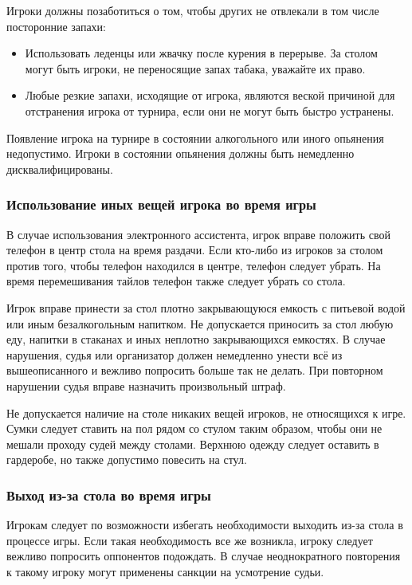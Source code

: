Игроки должны позаботиться о том, чтобы других не отвлекали в том числе посторонние запахи:
\begin{itemize}
	\item Использовать леденцы или жвачку после курения в перерыве. За столом могут быть игроки, не переносящие запах табака, уважайте их право.
	\item Любые резкие запахи, исходящие от игрока, являются веской причиной для отстранения игрока от турнира, если они не могут быть быстро устранены.
\end{itemize}

Появление игрока на турнире в состоянии алкогольного или иного опьянения недопустимо. Игроки в состоянии опьянения должны быть немедленно дисквалифицированы.

\subsubsection{Использование иных вещей игрока во время игры}
В случае использования электронного ассистента, игрок вправе положить свой телефон в центр стола на время раздачи. Если кто-либо из игроков за столом против того, чтобы телефон находился в центре, телефон следует убрать. На время перемешивания тайлов телефон также следует убрать со стола.

Игрок вправе принести за стол плотно закрывающуюся емкость с питьевой водой или иным безалкогольным напитком. Не допускается приносить за стол любую еду, напитки в стаканах и иных неплотно закрывающихся емкостях. В случае нарушения, судья или организатор должен немедленно унести всё из вышеописанного и вежливо попросить больше так не делать. При повторном нарушении судья вправе назначить произвольный штраф.

Не допускается наличие на столе никаких вещей игроков, не относящихся к игре. Сумки следует ставить на пол рядом со стулом таким образом, чтобы они не мешали проходу судей между столами. Верхнюю одежду следует оставить в гардеробе, но также допустимо повесить на стул.

\subsubsection{Выход из-за стола во время игры}

Игрокам следует по возможности избегать необходимости выходить из-за стола в процессе игры. Если такая необходимость все же возникла, игроку следует вежливо попросить оппонентов подождать. В случае неоднократного повторения к такому игроку могут применены санкции на усмотрение судьи.

